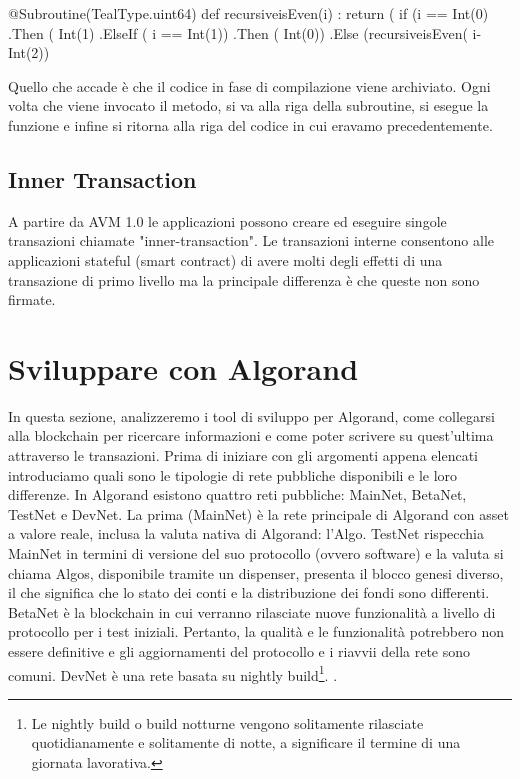 \begin{pythoncode}
@Subroutine(TealType.uint64)
def recursiveisEven(i) :
    return (
        if (i == Int(0)
        .Then ( Int(1)
        .ElseIf ( i == Int(1))
        .Then ( Int(0))
        .Else (recursiveisEven( i-Int(2))
\end{pythoncode}
% 

Quello che accade è che il codice in fase di compilazione viene archiviato. Ogni volta che viene invocato il metodo, si va alla riga della subroutine, si esegue la funzione e infine si ritorna alla riga del codice in cui eravamo precedentemente.

\subsection{Inner Transaction}
A partire da AVM 1.0 le applicazioni possono creare ed eseguire singole transazioni chiamate "inner-transaction". Le transazioni interne consentono alle applicazioni stateful (smart contract) di avere molti degli effetti di una transazione di primo livello ma la principale differenza è che queste non sono firmate.

\section{Sviluppare con Algorand}
In questa sezione, analizzeremo i tool di sviluppo per Algorand, come collegarsi alla blockchain per ricercare informazioni e come poter scrivere su quest'ultima attraverso le transazioni. Prima di iniziare con gli argomenti appena elencati introduciamo quali sono le tipologie di rete pubbliche disponibili e le loro differenze. In Algorand esistono quattro reti pubbliche: MainNet, BetaNet, TestNet e DevNet. La prima (MainNet) è la rete principale di Algorand con asset a valore reale, inclusa la valuta nativa di Algorand: l'Algo. TestNet rispecchia MainNet in termini di versione del suo protocollo (ovvero software) e la valuta si chiama Algos, disponibile tramite un dispenser, presenta il blocco genesi diverso, il che significa che lo stato dei conti e la distribuzione dei fondi sono differenti. BetaNet è la blockchain in cui verranno rilasciate nuove funzionalità a livello di protocollo per i test iniziali. Pertanto, la qualità e le funzionalità potrebbero non essere definitive e gli aggiornamenti del protocollo e i riavvii della rete sono comuni. DevNet è una rete basata su nightly build\footnote{Le nightly build o build notturne vengono solitamente rilasciate quotidianamente e solitamente di notte, a significare il termine di una giornata lavorativa.}. \cite{algorand_network}.

